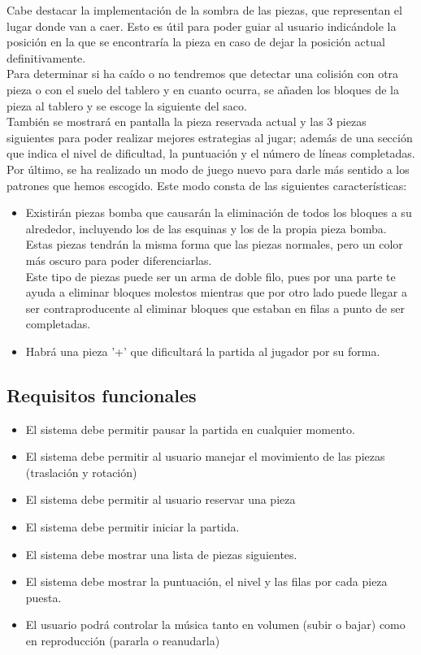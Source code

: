 \documentclass{article}
\begin{document}
Cabe destacar la implementación de la sombra de las piezas, que representan el lugar
donde van a caer. Esto es útil para poder guiar al usuario indicándole la posición
en la que se encontraría la pieza en caso de dejar la posición actual definitivamente.\\

Para determinar si ha caído o no tendremos que detectar una colisión con otra pieza
 o con el suelo del tablero y en cuanto ocurra, se añaden los bloques de la pieza
 al tablero y se escoge la siguiente del saco.\\

También se mostrará en pantalla la pieza reservada actual y las 3 piezas
siguientes para poder realizar mejores estrategias al jugar; además de una
sección que indica el nivel de dificultad, la puntuación y el número de líneas
completadas.\\

Por último, se ha realizado un modo de juego nuevo para darle más sentido a los
patrones que hemos escogido. Este modo consta de las siguientes características:

\begin{itemize}
\item Existirán piezas bomba que causarán la eliminación de todos los bloques a su alrededor,
incluyendo los de las esquinas y los de la propia pieza bomba. Estas piezas tendrán la misma forma
que las piezas normales, pero un color más oscuro para poder diferenciarlas.\\
Este tipo de piezas puede ser un arma de doble filo, pues por una parte te ayuda
 a eliminar bloques molestos mientras que por otro lado puede llegar a ser
 contraproducente al eliminar bloques que estaban en filas a punto de ser completadas.
\item Habrá una pieza '+' que dificultará la partida al jugador por su forma.
\end{itemize}


\subsection{Requisitos funcionales}
\begin{itemize}
    \item El sistema debe permitir pausar la partida en cualquier
    momento.
    \item El sistema debe permitir al usuario manejar el movimiento de
    las piezas (traslación y rotación)
    \item El sistema debe permitir al usuario reservar una pieza
    \item El sistema debe permitir iniciar la partida.
    \item El sistema debe mostrar una lista de piezas siguientes.
    \item El sistema debe mostrar la puntuación, el nivel y las filas por cada pieza puesta.
    \item El usuario podrá controlar la música tanto en volumen (subir o bajar) como en reproducción (pararla o reanudarla)
\end{itemize}
\end{document}
